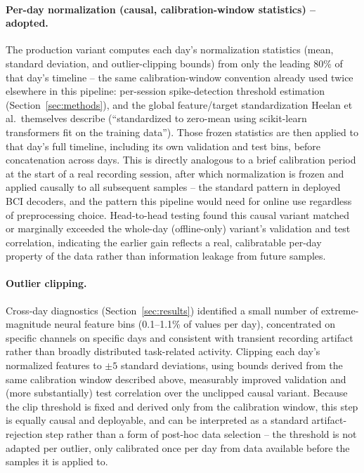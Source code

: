 \paragraph{Per-day normalization (causal, calibration-window statistics) --
adopted.} The production variant computes each day's normalization
statistics (mean, standard deviation, and outlier-clipping bounds) from only
the leading 80\% of that day's timeline -- the same calibration-window
convention already used twice elsewhere in this pipeline: per-session
spike-detection threshold estimation (Section~\ref{sec:methods}), and the
global feature/target standardization Heelan et al.\ themselves describe
(``standardized to zero-mean using scikit-learn transformers fit on the
training data''). Those frozen statistics are then applied to that day's
full timeline, including its own validation and test bins, before
concatenation across days. This is directly analogous to a brief
calibration period at the start of a real recording session, after which
normalization is frozen and applied causally to all subsequent samples --
the standard pattern in deployed BCI decoders, and the pattern this pipeline
would need for online use regardless of preprocessing choice. Head-to-head
testing found this causal variant matched or marginally exceeded the
whole-day (offline-only) variant's validation and test correlation,
indicating the earlier gain reflects a real, calibratable per-day property
of the data rather than information leakage from future samples.

\paragraph{Outlier clipping.} Cross-day diagnostics (Section~\ref{sec:results})
identified a small number of extreme-magnitude neural feature bins
(0.1--1.1\% of values per day), concentrated on specific channels on
specific days and consistent with transient recording artifact rather than
broadly distributed task-related activity. Clipping each day's normalized
features to $\pm5$ standard deviations, using bounds derived from the same
calibration window described above, measurably improved validation and (more
substantially) test correlation over the unclipped causal variant. Because
the clip threshold is fixed and derived only from the calibration window,
this step is equally causal and deployable, and can be interpreted as a
standard artifact-rejection step rather than a form of post-hoc data
selection -- the threshold is not adapted per outlier, only calibrated once
per day from data available before the samples it is applied to.

